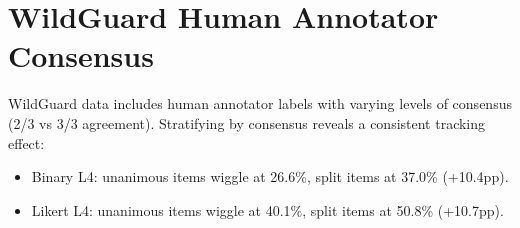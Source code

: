 


\section{WildGuard Human Annotator Consensus}
\label{sec:appendix-human-consensus}

WildGuard data includes human annotator labels with varying levels of consensus (2/3 vs 3/3 agreement). Stratifying by consensus reveals a consistent tracking effect:

\begin{itemize}
    \item Binary L4: unanimous items wiggle at 26.6\%, split items at 37.0\% (+10.4pp).
    \item Likert L4: unanimous items wiggle at 40.1\%, split items at 50.8\% (+10.7pp).
\end{itemize}

